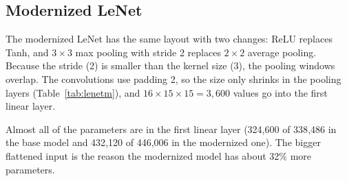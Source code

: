 \documentclass[12pt]{article}
\begin{document}
\subsection{Modernized LeNet}

The modernized LeNet has the same layout with two changes: ReLU replaces Tanh, and $3{\times}3$ max pooling with
stride 2 replaces $2{\times}2$ average pooling. Because the stride (2) is smaller than the kernel size (3), the pooling
windows overlap. The convolutions use padding 2, so the size only shrinks in the pooling layers
(Table~\ref{tab:lenetm}), and $16\times15\times15 = 3{,}600$ values go into the first linear layer.

\begin{table}[H]
\centering
\caption{Modernized LeNet layers (ReLU, overlapping max pooling; 446{,}006 parameters).}
\label{tab:lenetm}
\end{table}

Almost all of the parameters are in the first linear layer (324{,}600 of 338{,}486 in the base model and
432{,}120 of 446{,}006 in the modernized one). The bigger flattened input is the reason the modernized model has
about 32\% more parameters.
\end{document}
